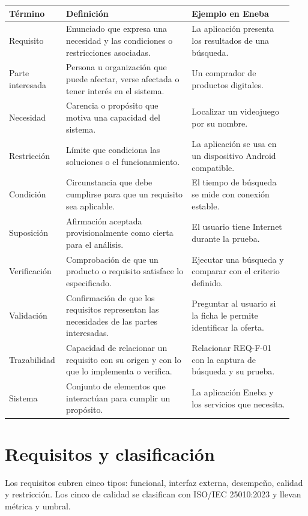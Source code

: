 \documentclass[10pt,a4paper]{article}
\begin{document}
	\begin{longtable}{p{0.18\linewidth}p{0.42\linewidth}p{0.34\linewidth}}
		\toprule
		\textbf{Término} & \textbf{Definición} & \textbf{Ejemplo en Eneba}\\
		\midrule
		\endhead
		Requisito & Enunciado que expresa una necesidad y las condiciones o restricciones asociadas. & La aplicación presenta los resultados de una búsqueda.\\
		Parte interesada & Persona u organización que puede afectar, verse afectada o tener interés en el sistema. & Un comprador de productos digitales.\\
		Necesidad & Carencia o propósito que motiva una capacidad del sistema. & Localizar un videojuego por su nombre.\\
		Restricción & Límite que condiciona las soluciones o el funcionamiento. & La aplicación se usa en un dispositivo Android compatible.\\
		Condición & Circunstancia que debe cumplirse para que un requisito sea aplicable. & El tiempo de búsqueda se mide con conexión estable.\\
		Suposición & Afirmación aceptada provisionalmente como cierta para el análisis. & El usuario tiene Internet durante la prueba.\\
		Verificación & Comprobación de que un producto o requisito satisface lo especificado. & Ejecutar una búsqueda y comparar con el criterio definido.\\
		Validación & Confirmación de que los requisitos representan las necesidades de las partes interesadas. & Preguntar al usuario si la ficha le permite identificar la oferta.\\
		Trazabilidad & Capacidad de relacionar un requisito con su origen y con lo que lo implementa o verifica. & Relacionar REQ-F-01 con la captura de búsqueda y su prueba.\\
		Sistema & Conjunto de elementos que interactúan para cumplir un propósito. & La aplicación Eneba y los servicios que necesita.\\
		\bottomrule
	\end{longtable}
	
	\section{Requisitos y clasificación}
	
	Los requisitos cubren cinco tipos: funcional, interfaz externa, desempeño, calidad y restricción. Los cinco de calidad se clasifican con ISO/IEC 25010:2023 \cite{iso25010} y llevan métrica y umbral.
	
\end{document}
